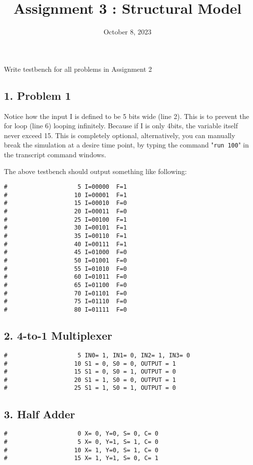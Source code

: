 \documentclass{vhdl-assignment}
\title{Assignment 3 : Structural Model}
\date{October 8, 2023}
\begin{document}
\maketitle
\thispagestyle{fancy}

\begin{problem}{Write testbench for all problems in Assignment 2}
    \subsection*{1. Problem 1}
    Notice how the input I is defined to be 5 bits wide (line 2).
    This is to prevent the for loop (line 6) looping infinitely.
    Because if I is only 4bits, the variable itself never exceed 15.
    This is completely optional, alternatively, you can manually break the simulation at a desire time point,
    by typing the command "\verb|run 100|" in the transcript command windows.
    
    The above testbench should output something like following:
\begin{lstlisting}[caption=Problems 1 Testbench Output]
#                    5 I=00000  F=1
#                   10 I=00001  F=1
#                   15 I=00010  F=0
#                   20 I=00011  F=0
#                   25 I=00100  F=1
#                   30 I=00101  F=1
#                   35 I=00110  F=1
#                   40 I=00111  F=1
#                   45 I=01000  F=0
#                   50 I=01001  F=0
#                   55 I=01010  F=0
#                   60 I=01011  F=0
#                   65 I=01100  F=0
#                   70 I=01101  F=0
#                   75 I=01110  F=0
#                   80 I=01111  F=0
\end{lstlisting}

    \subsection*{2. 4-to-1 Multiplexer}
\begin{lstlisting}[caption=4-to-1 Multiplexer Testbench Output]
#                    5 IN0= 1, IN1= 0, IN2= 1, IN3= 0
#                   10 S1 = 0, S0 = 0, OUTPUT = 1
#                   15 S1 = 0, S0 = 1, OUTPUT = 0
#                   20 S1 = 1, S0 = 0, OUTPUT = 1
#                   25 S1 = 1, S0 = 1, OUTPUT = 0
\end{lstlisting}

    \subsection*{3. Half Adder}
\begin{lstlisting}[caption=Half Adder Testbench Output]
#                    0 X= 0, Y=0, S= 0, C= 0
#                    5 X= 0, Y=1, S= 1, C= 0
#                   10 X= 1, Y=0, S= 1, C= 0
#                   15 X= 1, Y=1, S= 0, C= 1
\end{lstlisting}


\end{problem}
\end{document}

